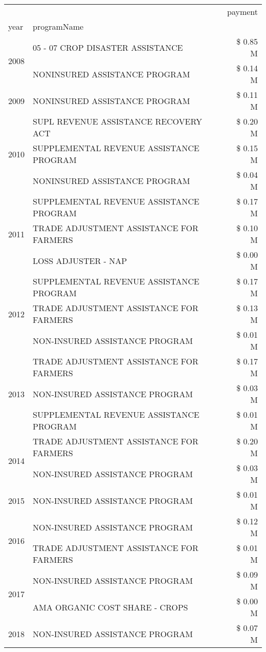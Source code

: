 \begin{tabular}{llr}
\toprule
 &  & payment \\
year & programName &  \\
\midrule
\multirow[t]{2}{*}{2008} & 05 - 07 CROP DISASTER ASSISTANCE & \$ 0.85 M \\
 & NONINSURED ASSISTANCE PROGRAM & \$ 0.14 M \\
\cline{1-3}
2009 & NONINSURED ASSISTANCE PROGRAM & \$ 0.11 M \\
\cline{1-3}
\multirow[t]{3}{*}{2010} & SUPL REVENUE ASSISTANCE RECOVERY ACT & \$ 0.20 M \\
 & SUPPLEMENTAL REVENUE ASSISTANCE PROGRAM & \$ 0.15 M \\
 & NONINSURED ASSISTANCE PROGRAM & \$ 0.04 M \\
\cline{1-3}
\multirow[t]{3}{*}{2011} & SUPPLEMENTAL REVENUE ASSISTANCE PROGRAM & \$ 0.17 M \\
 & TRADE ADJUSTMENT ASSISTANCE FOR FARMERS & \$ 0.10 M \\
 & LOSS ADJUSTER - NAP & \$ 0.00 M \\
\cline{1-3}
\multirow[t]{3}{*}{2012} & SUPPLEMENTAL REVENUE ASSISTANCE PROGRAM & \$ 0.17 M \\
 & TRADE ADJUSTMENT ASSISTANCE FOR FARMERS & \$ 0.13 M \\
 & NON-INSURED ASSISTANCE PROGRAM & \$ 0.01 M \\
\cline{1-3}
\multirow[t]{3}{*}{2013} & TRADE ADJUSTMENT ASSISTANCE FOR FARMERS & \$ 0.17 M \\
 & NON-INSURED ASSISTANCE PROGRAM & \$ 0.03 M \\
 & SUPPLEMENTAL REVENUE ASSISTANCE PROGRAM & \$ 0.01 M \\
\cline{1-3}
\multirow[t]{2}{*}{2014} & TRADE ADJUSTMENT ASSISTANCE FOR FARMERS & \$ 0.20 M \\
 & NON-INSURED ASSISTANCE PROGRAM & \$ 0.03 M \\
\cline{1-3}
2015 & NON-INSURED ASSISTANCE PROGRAM & \$ 0.01 M \\
\cline{1-3}
\multirow[t]{2}{*}{2016} & NON-INSURED ASSISTANCE PROGRAM & \$ 0.12 M \\
 & TRADE ADJUSTMENT ASSISTANCE FOR FARMERS & \$ 0.01 M \\
\cline{1-3}
\multirow[t]{2}{*}{2017} & NON-INSURED ASSISTANCE PROGRAM & \$ 0.09 M \\
 & AMA ORGANIC COST SHARE - CROPS & \$ 0.00 M \\
\cline{1-3}
2018 & NON-INSURED ASSISTANCE PROGRAM & \$ 0.07 M \\

\end{tabular}
